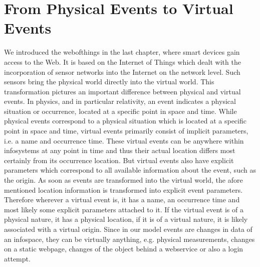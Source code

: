 \section{From Physical Events to Virtual Events}
We introduced the \textrm{\gls{webofthings}} in the last chapter, where smart devices gain access to the Web.
It is based on the \textrm{Internet of Things} which dealt with the incorporation of sensor networks into the Internet on the network level.
Such sensors bring the physical world directly into the virtual world.
This transformation pictures an important difference between physical and virtual events.
In physics, and in particular relativity, an event indicates a physical situation or occurrence, located at a specific point in space and time.
While physical events correspond to a physical situation which is located at a specific point in space and time, virtual events primarily consist of implicit parameters, i.e. a name and occurrence time.
These virtual events can be anywhere within \textrm{\glspl{infosystem}} at any point in time and thus their actual location differs most certainly from its occurrence location.
But virtual events also have explicit parameters which correspond to all available information about the event, such as the origin.
As soon as events are transformed into the virtual world, the afore mentioned location information is transformed into explicit event parameters.
Therefore wherever a virtual event is, it has a name, an occurrence time and most likely some explicit parameters attached to it.
If the virtual event is of a physical nature, it has a physical location, if it is of a virtual nature, it is likely associated with a virtual origin.
Since in our model events are changes in data of an \textrm{\gls{infospace}}, they can be virtually anything, e.g. physical measurements, changes on a static webpage, changes of the object behind a \textrm{\gls{webservice}} or also a login attempt.



